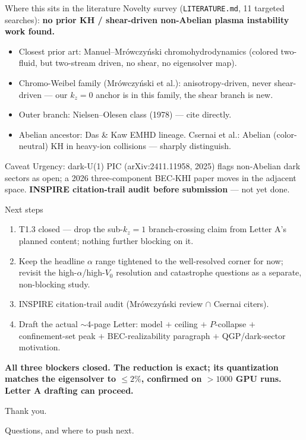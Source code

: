 \documentclass[aspectratio=169,11pt]{beamer}
\newenvironment{caveat}{\begin{alertblock}{Caveat}}{\end{alertblock}}
\newcommand{\Vo}{V_0}
\newcommand{\kz}{k_z}
\begin{document}
\begin{frame}{Where this sits in the literature}
\footnotesize
Novelty survey (\texttt{LITERATURE.md}, 11 targeted searches): \textbf{no prior
KH / shear-driven non-Abelian plasma instability work found.}
\begin{itemize}
\item Closest prior art: Manuel--Mr\'owczy\'nski chromohydrodynamics (colored
two-fluid, but two-stream driven, no shear, no eigensolver map).
\item Chromo-Weibel family (Mr\'owczy\'nski et al.): anisotropy-driven, never
shear-driven — our $\kz=0$ anchor is in this family, the shear branch is new.
\item Outer branch: Nielsen--Olesen class (1978) — cite directly.
\item Abelian ancestor: Das \& Kaw EMHD lineage. Csernai et al.: Abelian
(color-neutral) KH in heavy-ion collisions — sharply distinguish.
\end{itemize}
\begin{caveat}
Urgency: dark-U(1) PIC (arXiv:2411.11958, 2025) flags non-Abelian dark sectors
as open; a 2026 three-component BEC-KHI paper moves in the adjacent space.
\textbf{INSPIRE citation-trail audit before submission} — not yet done.
\end{caveat}
\end{frame}

\begin{frame}{Next steps}
\begin{enumerate}
\item T1.3 closed — drop the sub-$\kz=1$ branch-crossing claim from Letter A's
planned content; nothing further blocking on it.
\item Keep the headline $\alpha$ range tightened to the well-resolved corner for
now; revisit the high-$\alpha$/high-$\Vo$ resolution and catastrophe questions
as a separate, non-blocking study.
\item INSPIRE citation-trail audit (Mr\'owczy\'nski review $\cap$ Csernai
citers).
\item Draft the actual $\sim$4-page Letter: model $+$ ceiling $+$ $P$-collapse
$+$ confinement-set peak $+$ BEC-realizability paragraph $+$ QGP/dark-sector
motivation.
\end{enumerate}
\vspace{0.15em}
\centering\Large\textbf{All three blockers closed. The reduction is exact; its
quantization matches the eigensolver to $\le2\%$, confirmed on $>1000$ GPU
runs. Letter A drafting can proceed.}
\end{frame}

\begin{frame}
\centering
\Huge Thank you.
\vspace{0.15em}

\normalsize\normalfont Questions, and where to push next.
\end{frame}
\end{document}
